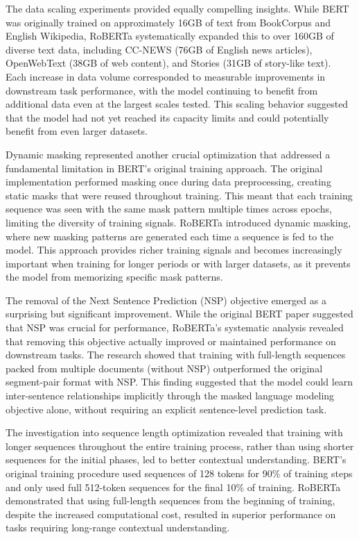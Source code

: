 \documentclass[
  titlepage]{article}
\begin{document}
The data scaling experiments provided equally compelling insights. While
BERT was originally trained on approximately 16GB of text from
BookCorpus and English Wikipedia, RoBERTa systematically expanded this
to over 160GB of diverse text data, including CC-NEWS (76GB of English
news articles), OpenWebText (38GB of web content), and Stories (31GB of
story-like text). Each increase in data volume corresponded to
measurable improvements in downstream task performance, with the model
continuing to benefit from additional data even at the largest scales
tested. This scaling behavior suggested that the model had not yet
reached its capacity limits and could potentially benefit from even
larger datasets.

Dynamic masking represented another crucial optimization that addressed
a fundamental limitation in BERT's original training approach. The
original implementation performed masking once during data
preprocessing, creating static masks that were reused throughout
training. This meant that each training sequence was seen with the same
mask pattern multiple times across epochs, limiting the diversity of
training signals. RoBERTa introduced dynamic masking, where new masking
patterns are generated each time a sequence is fed to the model. This
approach provides richer training signals and becomes increasingly
important when training for longer periods or with larger datasets, as
it prevents the model from memorizing specific mask patterns.

The removal of the Next Sentence Prediction (NSP) objective emerged as a
surprising but significant improvement. While the original BERT paper
suggested that NSP was crucial for performance, RoBERTa's systematic
analysis revealed that removing this objective actually improved or
maintained performance on downstream tasks. The research showed that
training with full-length sequences packed from multiple documents
(without NSP) outperformed the original segment-pair format with NSP.
This finding suggested that the model could learn inter-sentence
relationships implicitly through the masked language modeling objective
alone, without requiring an explicit sentence-level prediction task.

The investigation into sequence length optimization revealed that
training with longer sequences throughout the entire training process,
rather than using shorter sequences for the initial phases, led to
better contextual understanding. BERT's original training procedure used
sequences of 128 tokens for 90\% of training steps and only used full
512-token sequences for the final 10\% of training. RoBERTa demonstrated
that using full-length sequences from the beginning of training, despite
the increased computational cost, resulted in superior performance on
tasks requiring long-range contextual understanding.
\end{document}
